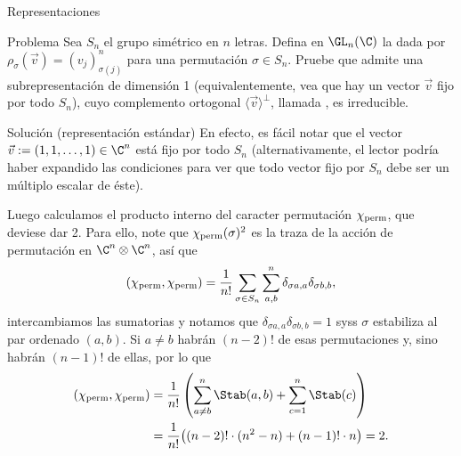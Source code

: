 \documentclass[10pt]{beamer}
\begin{document}
\begin{frame}{Representaciones}
	\begin{block}{Problema}
		Sea $S_n$ el grupo simétrico en $n$ letras.
		Defina en $\GL_n(\C)$ la  dada por $\rho_\sigma(\vec v) =
		(v_j)_{\sigma(j)}^n$ para una permutación $\sigma \in S_n$.
		\pause
		Pruebe que admite una subrepresentación de dimensión 1 (equivalentemente, vea que hay un vector $\vec v$
		fijo por todo $S_n$), cuyo complemento ortogonal $\langle \vec v \rangle^\perp$, llamada
		, es irreducible.
	\end{block}
\end{frame}
\begin{frame}{Solución (representación estándar)}
	\small
	En efecto, es fácil notar que el vector $\vec v := (1, 1, \dots, 1) \in \C^n$ está fijo por todo $S_n$
	\pause
	(alternativamente, el lector podría haber expandido las condiciones para ver que todo vector fijo por $S_n$ debe
	ser un múltiplo escalar de éste).

	\pause
	Luego calculamos el producto interno del caracter permutación $\chi_{\rm perm}$, que deviese dar 2.
	Para ello, note que $\chi_{\rm perm}(\sigma)^2$ es la traza de la acción de permutación en $\C^n \otimes \C^n$,
	así que
	\pause
	\[
		(\chi_{\rm perm}, \chi_{\rm perm}) = \frac{1}{n!} \sum_{\sigma\in S_n} \sum_{a, b}^{n} \delta_{\sigma a,
		a} \delta_{\sigma b, b},
	\]
	\pause
	intercambiamos las sumatorias y notamos que $\delta_{\sigma a, a} \delta_{\sigma b, b} = 1$ syss $\sigma$
	estabiliza al par ordenado $(a, b)$.
	\pause
	Si $a \ne b$ habrán $(n-2)!$ de esas permutaciones y, sino habrán $(n-1)!$ de ellas, por lo que
	\pause
	\begin{align*}
		(\chi_{\rm perm}, \chi_{\rm perm})
		&= \frac{1}{n!} \left( \sum_{a\ne b}^{n} \Stab(a, b) + \sum_{c=1}^{n} \Stab(c) \right) \\
		&= \frac{1}{n!} \big( (n-2)!\cdot(n^2 - n) + (n-1)!\cdot n \big) = 2.
	\end{align*}
\end{frame}
\end{document}

